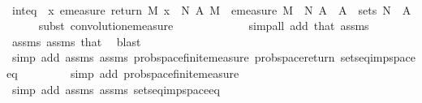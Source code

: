 \begin{isabellebody}
\ \ \ \ \isamarkupfalse%
\isanewline
\ \ \isamarkupfalse%
\ int{\isacharunderscore}{\kern0pt}eq{\isacharcolon}{\kern0pt}\ {\isachardoublequoteopen}{\isacharparenleft}{\kern0pt}{\isasymintegral}\isactrlsup {\isacharplus}{\kern0pt}\ x{\isachardot}{\kern0pt}\ emeasure\ {\isacharparenleft}{\kern0pt}return\ M\ x\ {\isasymstar}\ N{\isacharparenright}{\kern0pt}\ A{\isacharprime}{\kern0pt}\ {\isasympartial}M{\isacharparenright}{\kern0pt}\ {\isacharequal}{\kern0pt}\ {\isacharparenleft}{\kern0pt}emeasure\ {\isacharparenleft}{\kern0pt}M\ {\isasymstar}\ N{\isacharparenright}{\kern0pt}\ A{\isacharprime}{\kern0pt}{\isacharparenright}{\kern0pt}{\isachardoublequoteclose}\ \ {\isachardoublequoteopen}A{\isacharprime}{\kern0pt}\ {\isasymin}\ sets\ N{\isachardoublequoteclose}\ \ A{\isacharprime}{\kern0pt}\isanewline
\ \ \ \ \isamarkupfalse%
\ {\isacharparenleft}{\kern0pt}subst\ convolution{\isacharunderscore}{\kern0pt}emeasure{\isacharparenright}{\kern0pt}\isanewline
\ \ \ \ \ \ \ \ \ \ \ \isamarkupfalse%
\ {\isacharparenleft}{\kern0pt}simp{\isacharunderscore}{\kern0pt}all\ add{\isacharcolon}{\kern0pt}\ that\ assms{\isacharparenright}{\kern0pt}\isanewline
\ \ \ \ \isamarkupfalse%
\ assms{\isacharparenleft}{\kern0pt}{}{\isacharparenright}{\kern0pt}\ assms{\isacharparenleft}{\kern0pt}{}{\isacharparenright}{\kern0pt}\ that\ \isamarkupfalse%
\ blast\isanewline
\ \ \ \ \ \ \ \ \isamarkupfalse%
\ {\isacharparenleft}{\kern0pt}simp\ add{\isacharcolon}{\kern0pt}\ assms{\isacharparenleft}{\kern0pt}{}{\isacharparenright}{\kern0pt}\ assms{\isacharparenleft}{\kern0pt}{}{\isacharparenright}{\kern0pt}\ prob{\isacharunderscore}{\kern0pt}space{\isachardot}{\kern0pt}finite{\isacharunderscore}{\kern0pt}measure\ prob{\isacharunderscore}{\kern0pt}space{\isacharunderscore}{\kern0pt}return\ sets{\isacharunderscore}{\kern0pt}eq{\isacharunderscore}{\kern0pt}imp{\isacharunderscore}{\kern0pt}space{\isacharunderscore}{\kern0pt}eq{\isacharparenright}{\kern0pt}\isanewline
\ \ \ \ \ \ \ \isamarkupfalse%
\ {\isacharparenleft}{\kern0pt}simp\ add{\isacharcolon}{\kern0pt}\ prob{\isacharunderscore}{\kern0pt}space{\isachardot}{\kern0pt}finite{\isacharunderscore}{\kern0pt}measure{\isacharparenright}{\kern0pt}\isanewline
\ \ \ \ \ \ \isamarkupfalse%
\ {\isacharparenleft}{\kern0pt}simp\ add{\isacharcolon}{\kern0pt}\ assms{\isacharparenleft}{\kern0pt}{}{\isacharparenright}{\kern0pt}\ assms{\isacharparenleft}{\kern0pt}{}{\isacharparenright}{\kern0pt}\ sets{\isacharunderscore}{\kern0pt}eq{\isacharunderscore}{\kern0pt}imp{\isacharunderscore}{\kern0pt}space{\isacharunderscore}{\kern0pt}eq{\isacharparenright}{\kern0pt}\isanewline

\end{isabellebody}
